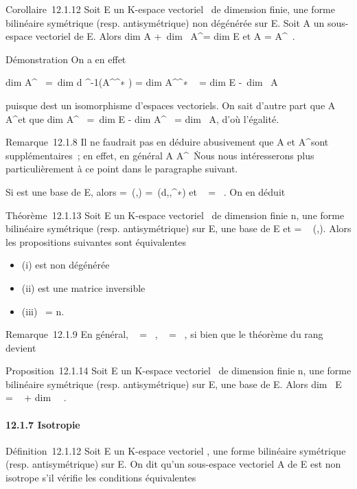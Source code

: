 Corollaire~12.1.12 Soit E un K-espace vectoriel ~de dimension finie, \phi
une forme bilinéaire symétrique (resp. antisymétrique) non dégénérée sur
E. Soit A un sous-espace vectoriel de E. Alors
dim A +\ dim~
A^\bot = dim E et A = A^\bot\bot~.

Démonstration On a en effet

dim A^\bot~ =\
dim d \phi^-1(A^\bot^∗ )
= dim A^\bot^∗ ~
= dim E -\ dim~ A

puisque d\phi est un isomorphisme d'espaces vectoriels. On sait
d'autre part que A \subset~ A^\bot\bot et que
dim A^\bot\bot~ =\
dim E - dim A^\bot~
= dim~ A, d'où l'égalité.

Remarque~12.1.8 Il ne faudrait pas en déduire abusivement que A et
A^\bot sont supplémentaires~; en effet, en général A \bigcap
A^\bot\neq~\0\.
Nous nous intéresserons plus particulièrement à ce point dans le
paragraphe suivant.

Si  est une base de E, alors \Omega =\
\mathrmMat (\phi,) =\
\mathrmMat (d\phi,,^∗) et
\mathrmrg~\phi
= \mathrmrg~\Omega. On en déduit

Théorème~12.1.13 Soit E un K-espace vectoriel ~de dimension finie n, \phi
une forme bilinéaire symétrique (resp. antisymétrique) sur E,  une base
de E et \Omega = \mathrmMat~
(\phi,). Alors les propositions suivantes sont équivalentes

\begin{itemize}
\itemsep1pt\parskip0pt
\item
  (i) \phi est non dégénérée
\item
  (ii) \Omega est une matrice inversible
\item
  (iii) \mathrmrg~\phi = n.
\end{itemize}

Remarque~12.1.9 En général,
\mathrmKer~\phi
= \mathrmKerd\phi~,
\mathrmrg~\phi
= \mathrmrgd\phi~, si
bien que le théorème du rang devient

Proposition~12.1.14 Soit E un K-espace vectoriel ~de dimension finie n,
\phi une forme bilinéaire symétrique (resp. antisymétrique) sur E,  une
base de E. Alors dim~ E
= \mathrmrg~\phi
+ dim~
\mathrmKer~\phi.

\paragraph{12.1.7 Isotropie}

Définition~12.1.12 Soit E un K-espace vectoriel , \phi une forme bilinéaire
symétrique (resp. antisymétrique) sur E. On dit qu'un sous-espace
vectoriel A de E est non isotrope s'il vérifie les conditions
équivalentes


